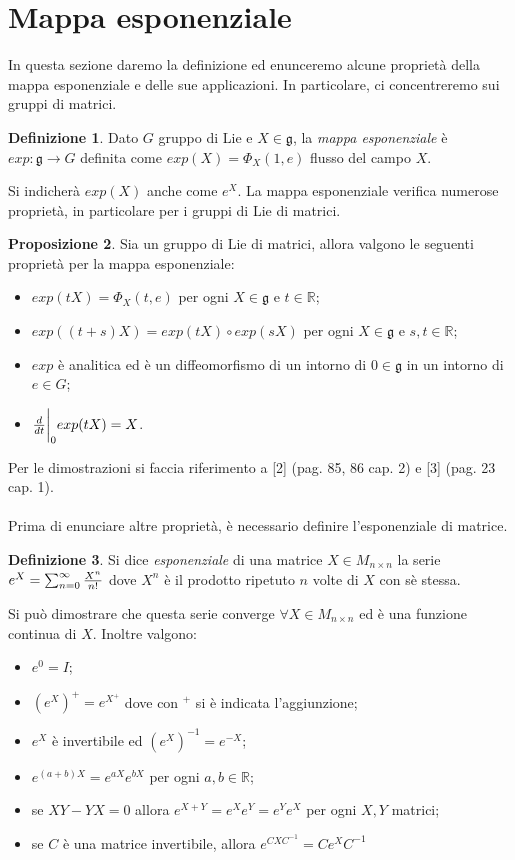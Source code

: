 \documentclass[12pt,a4paper]{report}
\theoremstyle{definition}
\newtheorem{Def}{Definizione}[chapter]
\newtheorem{Prop}[Def]{Proposizione}
\theoremstyle{definition}
\theoremstyle{definition}
\theoremstyle{remark}
\begin{document}
\section{Mappa esponenziale}
In questa sezione daremo la definizione ed enunceremo alcune proprietà della mappa esponenziale e delle sue applicazioni. In particolare, ci concentreremo sui gruppi di matrici.
\begin{Def}
	Dato $G$ gruppo di Lie e $X\in\mathfrak{g}$, la \textit{mappa esponenziale} è \\$exp:\mathfrak{g}\rightarrow G$ definita come $exp(X)=\Phi_X(1,e)$ flusso del campo $X$.
\end{Def}
Si indicherà $exp(X)$ anche come $e^X$.
La mappa esponenziale verifica numerose proprietà, in particolare per i gruppi di Lie di matrici.
\begin{Prop}
	Sia un gruppo di Lie di matrici, allora valgono le seguenti proprietà per la mappa esponenziale:\begin{itemize}
		\item $exp(tX)=\Phi_X(t,e)$ per ogni $X\in \mathfrak{g}$ e $t\in \mathbb{R}$;
		\item $exp((t+s)X)=exp(tX)\circ exp(sX)$ per ogni $X\in \mathfrak{g}$ e $s,t\in\mathbb{R}$;
		\item $exp$ è analitica ed è un diffeomorfismo di un intorno di $0\in\mathfrak{g}$ in un intorno di $e\in G$;
		\item ${d\over dt}\bigg{\rvert}_0exp(tX)=X$. 
	\end{itemize}
\end{Prop}
Per le dimostrazioni si faccia riferimento a [2] (pag. 85, 86 cap. 2) e [3] (pag. 23 cap. 1).\\
\\
Prima di enunciare altre proprietà, è necessario definire l'esponenziale di matrice.
\begin{Def}
	Si dice \textit{esponenziale} di una matrice $X\in M_{n\times n}$ la serie \\$e^X=\sum_{n=0}^{\infty}{X^n\over n! }$ dove $X^n$ è il prodotto ripetuto $n$ volte di $X$ con sè stessa.
\end{Def}
Si può dimostrare che questa serie converge $\forall X\in M_{n\times n}$ ed è una funzione continua di $X$. Inoltre valgono:\begin{itemize}
	\item $e^0=I$;
	\item $(e^X)^+=e^{X^+}$ dove con $^+$ si è indicata l'aggiunzione;
	\item $e^X$ è invertibile ed $(e^X)^{-1}=e^{-X}$;
	\item $e^{(a+b)X}=e^{aX}e^{bX}$ per ogni $a,b\in\mathbb{R}$;
	\item se $XY-YX=0$ allora $e^{X+Y}=e^Xe^Y=e^Ye^X$ per ogni $X,Y$ matrici;\\
	\item se $C$ è una matrice invertibile, allora $e^{CXC^{-1}}=Ce^XC^{-1}$
\end{itemize} 
\end{document}
